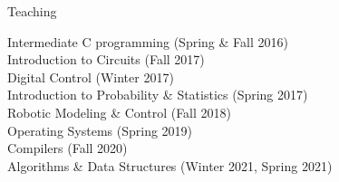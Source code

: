 \documentclass{resume} %
\begin{document}
\begin{rSection}{Teaching}


Intermediate C programming  (Spring \& Fall 2016) \\ 
Introduction to Circuits (Fall 2017) \\ 
Digital Control (Winter 2017) \\ 
Introduction to Probability \& Statistics (Spring 2017) \\
Robotic Modeling \& Control (Fall 2018) \\
Operating Systems (Spring 2019) \\
Compilers (Fall 2020) \\
Algorithms \& Data Structures (Winter 2021, Spring 2021) 


\end{rSection}



\end{document}
